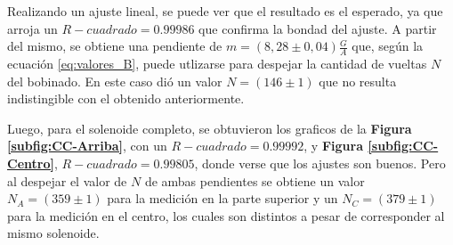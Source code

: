 \documentclass[11pt,a4paper]{article}
\begin{document}
Realizando un ajuste lineal, se puede ver que el resultado es el esperado, ya que arroja un $R-cuadrado= 0.99986$ que confirma la bondad del ajuste. A partir del mismo, se obtiene una pendiente de $m = (8,28 \pm 0,04)\frac{G}{A}$ que, según la ecuación \eqref{eq:valores_B}, puede utlizarse para despejar la cantidad de vueltas $N$ del bobinado. En este caso dió un valor $N= (146 \pm 1)$ que no resulta indistingible con el obtenido anteriormente.

Luego, para el solenoide completo, se obtuvieron los graficos de la \textbf{Figura \ref{subfig:CC-Arriba}}, con un $R-cuadrado= 0.99992$, y \textbf{Figura \ref{subfig:CC-Centro}}, $R-cuadrado= 0.99805$,  donde verse que los ajustes son buenos. Pero al despejar el valor de $N$ de ambas pendientes se obtiene un valor $N_{A} = (359 \pm 1)$ para la medición en la parte superior y un $N_{C}=(379 \pm 1)$ para la medición en el centro, los cuales son distintos a pesar de corresponder al mismo solenoide.
\end{document}
